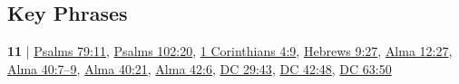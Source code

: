 		
		
\subsection{Key Phrases} %
	\label{DEATH-PHRASES}

	\begin{compactdesc}
		
		\item[appointed to death/die] \textbf{11} | \hyperref[PSALMS-79-11]{Psalms 79:11}, \hyperref[PSALMS-102-20]{Psalms 102:20}, \hyperref[1CORINTHIANS-4-9]{1 Corinthians 4:9}, \hyperref[HEBREWS-9-27]{Hebrews 9:27}, \hyperref[ALMA-12-27]{Alma 12:27}, \hyperref[ALMA-40-7]{Alma 40:7--9}, \hyperref[ALMA-40-21]{Alma 40:21}, \hyperref[ALMA-42-6]{Alma 42:6}, \hyperref[DC29-43]{DC 29:43}, \hyperref[DC42-48]{DC 42:48}, \hyperref[DC63-50]{DC 63:50}
			\begin{compactdesc}
				\item[Bible anchor verses] \phantom{.}
					\begin{compactdesc}
						\item[Psalms 79:11]
						\item[Psalms 102:20]
						\item[1 Corinthians 4:9]
						\item[Hebrews 9:27]
					\end{compactdesc}
				\item[Commentary]
			\end{compactdesc}
		

\end{compactdesc}
